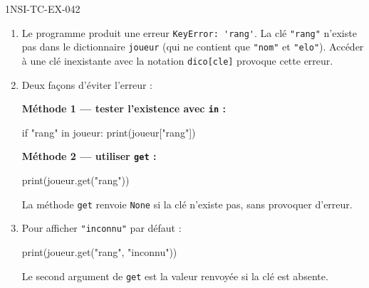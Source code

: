 \begin{corrige}{1NSI-TC-EX-042}
\begin{enumerate}
  \item Le programme produit une erreur \lstinline{KeyError: 'rang'}. La clé \lstinline{"rang"} n'existe pas dans le dictionnaire \lstinline{joueur} (qui ne contient que \lstinline{"nom"} et \lstinline{"elo"}). Accéder à une clé inexistante avec la notation \lstinline{dico[cle]} provoque cette erreur.

  \item Deux façons d'éviter l'erreur :

  \textbf{Méthode 1 --- tester l'existence avec \lstinline{in} :}
\begin{python}
if "rang" in joueur:
    print(joueur["rang"])
\end{python}

  \textbf{Méthode 2 --- utiliser \lstinline{get} :}
\begin{python}
print(joueur.get("rang"))
\end{python}
  La méthode \lstinline{get} renvoie \lstinline{None} si la clé n'existe pas, sans provoquer d'erreur.

  \item Pour afficher \lstinline{"inconnu"} par défaut :
\begin{python}
print(joueur.get("rang", "inconnu"))
\end{python}
  Le second argument de \lstinline{get} est la valeur renvoyée si la clé est absente.
\end{enumerate}
\end{corrige}
